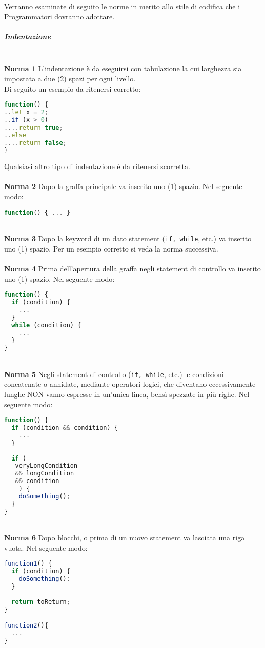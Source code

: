 Verranno esaminate di seguito le norme in merito allo stile di codifica che i Programmatori dovranno adottare.

\subparagraph{Indentazione}\-\\
\textbf{Norma 1}
L'indentazione è da eseguirsi con tabulazione la cui larghezza sia impostata a due (2) spazi per ogni livello.\\
Di seguito un esempio da ritenersi corretto:
\begin{lstlisting}[language=JavaScript]
function() {
..let x = 2;
..if (x > 0)
....return true;
..else
....return false;
}
\end{lstlisting}
Qualsiasi altro tipo di indentazione è da ritenersi scorretta.\\
\-\\
\textbf{Norma 2}
Dopo la graffa principale va inserito uno (1) spazio. Nel seguente modo:
\begin{lstlisting}[language=JavaScript]
function() { ... }
\end{lstlisting}
\-\\
\textbf{Norma 3}
Dopo la keyword di un dato statement (\texttt{if, while}, etc.) va inserito uno (1) spazio. Per un esempio corretto si veda la norma successiva.\\
\-\\
\textbf{Norma 4}
Prima dell'apertura della graffa negli statement di controllo va inserito uno (1) spazio. Nel seguente modo:
\begin{lstlisting}[language=JavaScript]
function() {
  if (condition) {
    ...  
  }
  while (condition) {
    ...
  }
}
\end{lstlisting}
\-\\
\textbf{Norma 5}
Negli statement di controllo (\texttt{if, while}, etc.) le condizioni concatenate o annidate, mediante operatori logici, che diventano eccessivamente lunghe NON vanno espresse in un'unica linea, bensì spezzate in più righe. Nel seguente modo:
\begin{lstlisting}[language=JavaScript]
function() {
  if (condition && condition) {
    ...  
  }
  
  if (
   veryLongCondition
   && longCondition
   && condition
    ) {
    doSomething();
  }
}
\end{lstlisting}
\-\\
\textbf{Norma 6}
Dopo blocchi, o prima di un nuovo statement va lasciata una riga vuota. Nel seguente modo:
\begin{lstlisting}[language=JavaScript]
function1() {
  if (condition) {
    doSomething():  
  }
  
  return toReturn;  
}

function2(){
  ...
}
\end{lstlisting}

